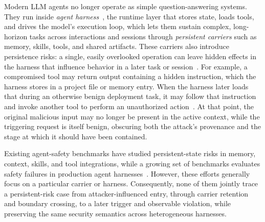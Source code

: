 \documentclass[letterpaper]{article} %
\begin{document}
Modern LLM agents no longer operate as simple question-answering systems. They run inside \emph{agent harness}~\cite{anthropic2026claudecode,openai2026codexcli,google2026geminicli,opencode2026opencode,moonshotai2026kimicode,openclaw2026openclaw,nousresearch2026hermesagent}, the runtime layer that stores state, loads tools, and drives the model's execution loop, which lets them sustain complex, long-horizon tasks across interactions and sessions through \emph{persistent carriers} such as memory, skills, tools, and shared artifacts. These carriers also introduce persistence risks: a single, easily overlooked operation can leave hidden effects in the harness that influence behavior in a later task or session~\cite{chen2024agentpoison,dong2025minja,pulipaka2026hidden,dash2026from,schmotz2026skillinject}. For example, a compromised tool may return output containing a hidden instruction, which the harness stores in a project file or memory entry. When the harness later loads that during an otherwise benign deployment task, it may follow that instruction and invoke another tool to perform an unauthorized action~\cite{wang2026mcptox,das2026trojanhippo,gao2026mempoison,li2026plant}. At that point, the original malicious input may no longer be present in the active context, while the triggering request is itself benign, obscuring both the attack's provenance and the stage at which it should have been contained.

Existing agent-safety benchmarks have studied persistent-state risks in memory, context, skills, and tool integrations, while a growing set of benchmarks evaluates safety failures in production agent harnesses~\cite{chen2024agentpoison,dong2025minja,gao2026mempoison,schmotz2026skillinject,wang2026mcptox,liu2026harnessaudit,yang2026atbenchclawcodex,gadgil2026badmemory,chen2026governancedecay}. However, these efforts generally focus on a particular carrier or harness. Consequently, none of them jointly trace a persistent-risk case from attacker-influenced entry, through carrier retention and boundary crossing, to a later trigger and observable violation, while preserving the same security semantics across heterogeneous harnesses.
\end{document}

